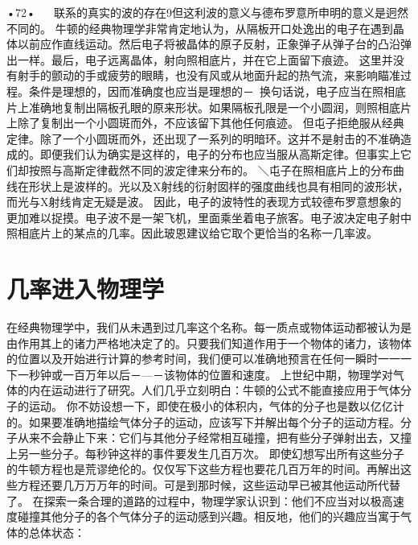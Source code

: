 •72•
  
联系的真实的波的存在9但这利波的意义与德布罗意所申明的意义是迥然不同的。
牛顿的经典物理学非常肯定地认为，从隔板开口处逸出的电子在遇到晶体以前应作直线运动。然后电子将被晶体的原子反射，正象弹子从弹子台的凸沿弹出一样。最后，电子远离晶体，射向照相底片，并在它上面留下痕迹。
这里并没有射手的颤动的手或疲劳的眼睛，也没有风或从地面升起的热气流，来影响瞄准过程。条件是理想的，因而准确度也应当是理想的－~换句话说，电子应当在照相底片上准确地复制出隔板孔眼的原来形状。如果隔板孔限是一个小圆润，则照相底片上除了复制出一个小圆斑而外，不应该留下其他任何痕迹。
但屯子拒绝服从经典定律。除了一个小圆斑而外，还出现了一系列的明暗环。这并不是射击的不准确造成的。即便我们认为确实是这样的，电子的分布也应当服从高斯定律。但事实上它们却按照与高斯定律截然不同的波定律来分布的。
＼屯子在照相底片上的分布曲线在形状上是波样的。光以及X射线的衍射囡样的强度曲线也具有相同的波形状，而光与X射线肯定无疑是波。
因此，电子的波特性的表现方式较德布罗意想象的更加难以捉摸。电子波不是一架飞机，里面乘坐着电子旅客。电子波决定电子射中照相底片上的某点的几率。因此玻恩建议给它取个更恰当的名称一几率波。

\section{几率进入物理学}

在经典物理学中，我们从未遇到过几率这个名称。每一质点或物体运动都被认为是由作用其上的诸力严格地决定了的。只要我们知道作用于一个物体的诸力，该物体的位置以及开始进行计算的参考时间，我们便可以准确地预言在任何一瞬时一一一下一秒钟或一百万年以后－—－该物体的位置和速度。
上世纪中期，物理学对气体的内在运动进行了研究。人们几乎立刻明白：牛顿的公式不能直接应用于气体分子的运动。
你不妨设想一下，即使在极小的体积内，气体的分子也是数以亿亿计的。如果要准确地描绘气体分子的运动，应该写下并解出每个分子的运动方程。分子从来不会静止下来：它们与其他分子经常相互碰撞，把有些分子弹射出去，又撞上另一些分子。每秒钟这祥的事件要发生几百万次。
即使幻想写出所有这些分子的牛顿方程也是荒谬绝伦的。仅仅写下这些方程也要花几百万年的时间。再解出这些方程还要几万万万年的时间。可是到那时候，这些运动早已被其他运动所代替了。
在探索一条合理的道路的过程中，物理学家认识到：他们不应当对以极高速度碰撞其他分子的各个气体分子的运动感到兴趣。相反地，他们的兴趣应当寓于气体的总体状态：

